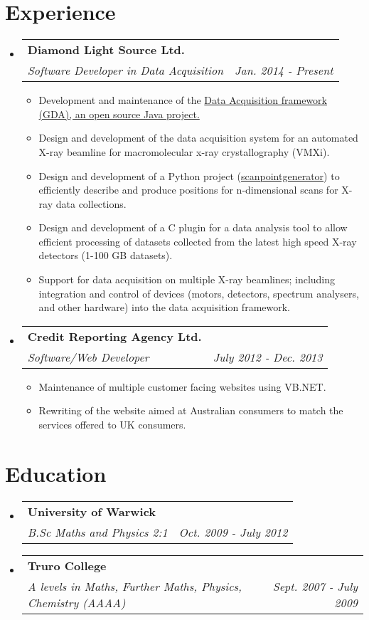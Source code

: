\documentclass[11pt]{article}
\makeatletter
\newcommand{\cvheading}[3]{
    \begin{tabular*}{0.9\textwidth}[t]{l@{\extracolsep{\fill}}r}
        \textbf{#1}\\
        \textit{#2} & \textit{#3}\\
    \end{tabular*}\vspace{-5pt}
}
\newcommand{\cvitem}[1]{\item #1\vspace{-2pt}}
\makeatother
\begin{document}
\section{Experience}
\begin{itemize}
    \item
        \cvheading
            {Diamond Light Source Ltd.}
            {Software Developer in Data Acquisition}{Jan. 2014 - Present}
            \begin{itemize}
            \cvitem
                {Development and maintenance of the
                \href{https://github.com/openGDA}{Data Acquisition framework (GDA), an open source Java project.}}
            \cvitem
                {Design and development of the data acquisition system for an automated X-ray beamline for
                macromolecular x-ray crystallography (VMXi).}
            \cvitem
            {Design and development of a Python project
                (\href{https://github.com/dls-controls/scanpointgenerator}{scanpointgenerator})
                to efficiently describe and produce positions for n-dimensional scans for X-ray data collections.}
            \cvitem
                {Design and development of a C plugin for a data analysis tool to allow efficient processing of datasets
                collected from the latest high speed X-ray detectors (1-100 GB datasets).}
            \cvitem
                {Support for data acquisition on multiple X-ray beamlines; including integration and control of devices
                (motors, detectors, spectrum analysers, and other hardware) into the data acquisition framework.}
            \end{itemize}
    \item
        \cvheading
            {Credit Reporting Agency Ltd.}
            {Software/Web Developer}{July 2012 - Dec. 2013}
            \begin{itemize}
            \cvitem
                {Maintenance of multiple customer facing websites using VB.NET.}
            \cvitem
                {Rewriting of the website aimed at Australian consumers to match the services
                offered to UK consumers.}
            \end{itemize}

\end{itemize}

\section{Education}
\begin{itemize}
    \item
        \cvheading
            {University of Warwick}
            {B.Sc Maths and Physics 2:1}{Oct. 2009 - July 2012}
    \item
        \cvheading
            {Truro College}
            {A levels in Maths, Further Maths, Physics, Chemistry (AAAA)}{Sept. 2007 - July 2009}
\end{itemize}
\end{document}
